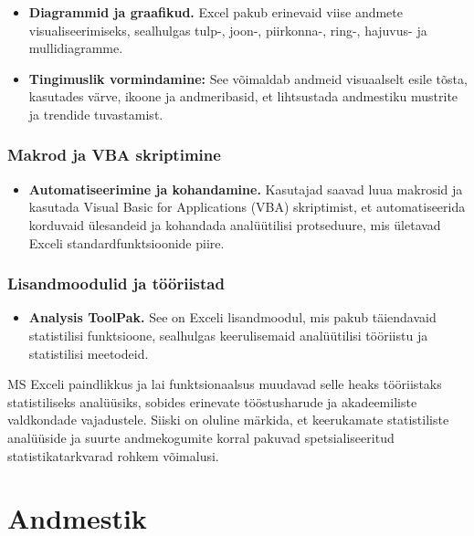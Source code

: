 \documentclass[
]{book}
\providecommand{\tightlist}{%
  \setlength{\itemsep}{0pt}\setlength{\parskip}{0pt}}
\begin{document}
\begin{itemize}
\tightlist
\item
  \textbf{Diagrammid ja graafikud.} Excel pakub erinevaid viise andmete visualiseerimiseks, sealhulgas tulp-, joon-, piirkonna-, ring-, hajuvus- ja mullidiagramme.
\item
  \textbf{Tingimuslik vormindamine:} See võimaldab andmeid visuaalselt esile tõsta, kasutades värve, ikoone ja andmeribasid, et lihtsustada andmestiku mustrite ja trendide tuvastamist.
\end{itemize}

\subsection{Makrod ja VBA skriptimine}\label{makrod-ja-vba-skriptimine}

\begin{itemize}
\tightlist
\item
  \textbf{Automatiseerimine ja kohandamine.} Kasutajad saavad luua makrosid ja kasutada Visual Basic for Applications (VBA) skriptimist, et automatiseerida korduvaid ülesandeid ja kohandada analüütilisi protseduure, mis ületavad Exceli standardfunktsioonide piire.
\end{itemize}

\subsection{Lisandmoodulid ja tööriistad}\label{lisandmoodulid-ja-tuxf6uxf6riistad}

\begin{itemize}
\tightlist
\item
  \textbf{Analysis ToolPak.} See on Exceli lisandmoodul, mis pakub täiendavaid statistilisi funktsioone, sealhulgas keerulisemaid analüütilisi tööriistu ja statistilisi meetodeid.
\end{itemize}

MS Exceli paindlikkus ja lai funktsionaalsus muudavad selle heaks tööriistaks statistiliseks analüüsiks, sobides erinevate tööstusharude ja akadeemiliste valdkondade vajadustele. Siiski on oluline märkida, et keerukamate statistiliste analüüside ja suurte andmekogumite korral pakuvad spetsialiseeritud statistikatarkvarad rohkem võimalusi.

\chapter{Andmestik}\label{andmestik}
\end{document}
